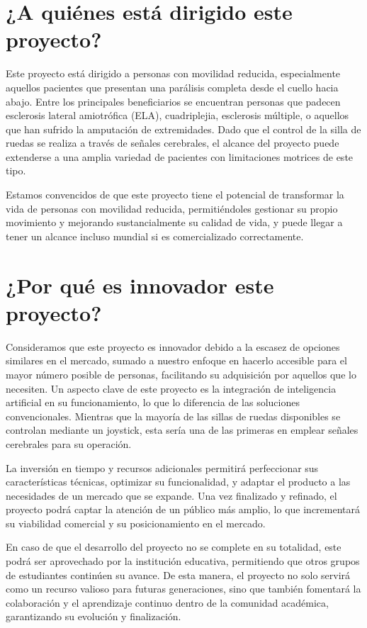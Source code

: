 \documentclass{article}
\begin{document}
\section{¿A quiénes está dirigido este proyecto?}
Este proyecto está dirigido a personas con movilidad reducida, especialmente aquellos pacientes que presentan una parálisis completa desde el cuello hacia abajo. Entre los principales beneficiarios se encuentran personas que padecen esclerosis lateral amiotrófica (ELA), cuadriplejia, esclerosis múltiple, o aquellos que han sufrido la amputación de extremidades. Dado que el control de la silla de ruedas se realiza a través de señales cerebrales, el alcance del proyecto puede extenderse a una amplia variedad de pacientes con limitaciones motrices de este tipo.


Estamos convencidos de que este proyecto tiene el potencial de transformar la vida de personas con movilidad reducida, permitiéndoles gestionar su propio movimiento y mejorando sustancialmente su calidad de vida, y puede llegar a tener un alcance incluso mundial si es comercializado correctamente.

\section{¿Por qué es innovador este proyecto?}

Consideramos que este proyecto es innovador debido a la escasez de opciones similares en el mercado, sumado a nuestro enfoque en hacerlo accesible para el mayor número posible de personas, facilitando su adquisición por aquellos que lo necesiten. Un aspecto clave de este proyecto es la integración de inteligencia artificial en su funcionamiento, lo que lo diferencia de las soluciones convencionales. Mientras que la mayoría de las sillas de ruedas disponibles se controlan mediante un joystick, esta sería una de las primeras en emplear señales cerebrales para su operación.

La inversión en tiempo y recursos adicionales permitirá perfeccionar sus características técnicas, optimizar su funcionalidad, y adaptar el producto a las necesidades de un mercado que se expande. Una vez finalizado y refinado, el proyecto podrá captar la atención de un público más amplio, lo que incrementará su viabilidad comercial y su posicionamiento en el mercado.

En caso de que el desarrollo del proyecto no se complete en su totalidad, este podrá ser aprovechado por la institución educativa, permitiendo que otros grupos de estudiantes continúen su avance. De esta manera, el proyecto no solo servirá como un recurso valioso para futuras generaciones, sino que también fomentará la colaboración y el aprendizaje continuo dentro de la comunidad académica, garantizando su evolución y finalización.
\end{document}
